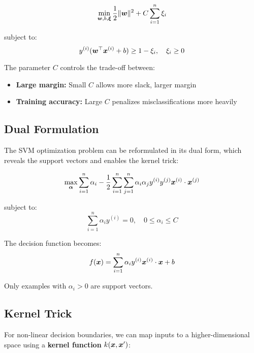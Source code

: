 \begin{equation}
\min_{\boldsymbol{w}, b, \boldsymbol{\xi}} \frac{1}{2}\|\boldsymbol{w}\|^2 + C \sum_{i=1}^{n} \xi_i
\end{equation}

subject to:
\begin{equation}
y^{(i)}(\boldsymbol{w}^\top \boldsymbol{x}^{(i)} + b) \geq 1 - \xi_i, \quad \xi_i \geq 0
\end{equation}

The parameter $C$ controls the trade-off between:
\begin{itemize}
    \item \textbf{Large margin:} Small $C$ allows more slack, larger margin
    \item \textbf{Training accuracy:} Large $C$ penalizes misclassifications more heavily
\end{itemize}

\subsection{Dual Formulation}

The SVM optimization problem can be reformulated in its dual form, which reveals the support vectors and enables the kernel trick:

\begin{equation}
\max_{\boldsymbol{\alpha}} \sum_{i=1}^{n} \alpha_i - \frac{1}{2} \sum_{i=1}^{n} \sum_{j=1}^{n} \alpha_i \alpha_j y^{(i)} y^{(j)} \boldsymbol{x}^{(i)} \cdot \boldsymbol{x}^{(j)}
\end{equation}

subject to:
\begin{equation}
\sum_{i=1}^{n} \alpha_i y^{(i)} = 0, \quad 0 \leq \alpha_i \leq C
\end{equation}

The decision function becomes:
\begin{equation}
f(\boldsymbol{x}) = \sum_{i=1}^{n} \alpha_i y^{(i)} \boldsymbol{x}^{(i)} \cdot \boldsymbol{x} + b
\end{equation}

Only examples with $\alpha_i > 0$ are support vectors.

\subsection{Kernel Trick}

For non-linear decision boundaries, we can map inputs to a higher-dimensional space using a \textbf{kernel function} $k(\boldsymbol{x}, \boldsymbol{x}')$:

